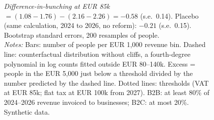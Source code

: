 \begin{figure}[t]

\vspace{0.4ex}
\begin{minipage}{0.97\textwidth}\footnotesize
\textit{Difference-in-bunching at EUR 85k} $=(1.08-1.76)-(2.16-2.26)=-0.58$
(s.e.\ 0.14). Placebo (same calculation, 2024 to 2026, no reform): $-0.21$
(s.e.\ 0.15). Bootstrap standard errors, 200 resamples of people.\\
\textit{Notes:} Bars: number of people per EUR 1,000 revenue bin. Dashed line: counterfactual distribution without
cliffs, a fourth-degree polynomial in log counts fitted outside EUR 80--140k. Excess = people in the EUR 5,000 just
below a threshold divided by the number predicted by the dashed line. Dotted lines: thresholds (VAT at EUR 85k;
flat tax at EUR 100k from 2027). B2B: at least 80\% of 2024--2026 revenue invoiced to businesses; B2C: at most 20\%.
Synthetic data.
\end{minipage}
\end{figure}
